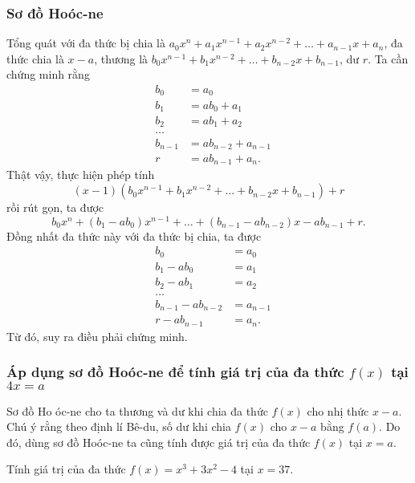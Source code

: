 \subsubsection{Sơ đồ Hoóc-ne}
Tổng quát với đa thức bị chia là $a_0x^n+a_1x^{n-1}+a_2x^{n-2}+\ldots+a_{n-1}x+a_n$, đa thức chia là $x-a$, thương là $b_0x^{n-1}+b_1x^{n-2}+\ldots+b_{n-2}x+b_{n-1}$, dư $r$. Ta cần chứng minh rằng
\begin{eqnarray*}
&b_0&=a_0\\
&b_1&=ab_0+a_1\\
&b_2&=ab_1+a_2\\
&\ldots&\\
&b_{n-1}&=ab_{n-2}+a_{n-1}\\
&r&=ab_{n-1}+a_n.
\end{eqnarray*}
Thật vậy, thực hiện phép tính
\[(x-1)(b_0x^{n-1}+b_1x^{n-2}+\ldots+b_{n-2}x+b_{n-1})+r\]
rồi rút gọn, ta được
\[b_0x^{n}+(b_1-ab_0)x^{n-1}+\ldots+(b_{n-1}-ab_{n-2})x-ab_{n-1}+r.\]
Đồng nhất đa thức này với đa thức bị chia, ta được
\begin{eqnarray*}
	&b_0&=a_0\\
	&b_1-ab_0&=a_1\\
	&b_2-ab_1&=a_2\\
	&\ldots&\\
	&b_{n-1}-ab_{n-2}&=a_{n-1}\\
	&r-ab_{n-1}&=a_n.
\end{eqnarray*}
Từ đó, suy ra điều phải chứng minh.
\subsubsection{Áp dụng sơ đồ Hoóc-ne để tính giá trị của đa thức $f(x)$ tại $4x=a$}
Sơ đồ Ho óc-ne cho ta thương và dư khi chia đa thức $f(x)$ cho nhị thức $x-a$. Chú ý rằng theo định lí Bê-du, số dư khi chia $f(x)$ cho $x-a$ bằng $f(a)$. Do đó, dùng sơ đồ Hoóc-ne ta cũng tính được giá trị của đa thức $f(x)$ tại $x=a$.
\begin{vd}%
	Tính giá trị của đa thức $f(x)=x^3+3x^2-4$ tại $x=37$.
\end{vd}

